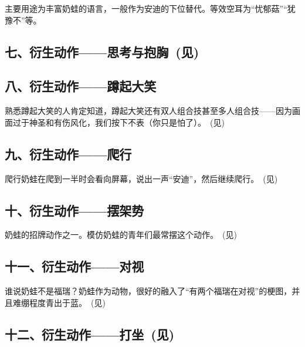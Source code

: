 主要用途为丰富奶蛙的语言，一般作为安迪的下位替代。等效空耳为“忧郁菇”“犹豫不”等。



\subsection[七、衍生动作——思考与抱胸]{七、衍生动作——思考与抱胸~(见)}



\clearpage
\subsection{八、衍生动作——蹲起大笑}



熟悉蹲起大笑的人肯定知道，蹲起大笑还有双人组合技甚至多人组合技——因为画面过于神圣和有伤风化，我们按下不表（你只是怕了）。~(见)

\subsection{九、衍生动作——爬行}



爬行奶蛙在爬到一半时会看向屏幕，说出一声“安迪”，然后继续爬行。~(见)

\subsection{十、衍生动作——摆架势}



奶蛙的招牌动作之一。模仿奶蛙的青年们最常摆这个动作。~(见)

\clearpage
\subsection{十一、衍生动作——对视}



谁说奶蛙不是福瑞？奶蛙作为动物，很好的融入了“有两个福瑞在对视”的梗图，并且难绷程度青出于蓝。~(见)

\subsection[十二、衍生动作——打坐]{十二、衍生动作——打坐~(见)}

